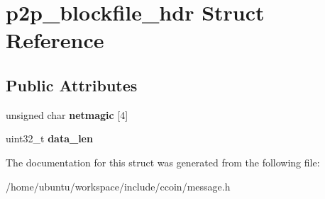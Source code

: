 \hypertarget{structp2p__blockfile__hdr}{\section{p2p\-\_\-blockfile\-\_\-hdr Struct Reference}
\label{structp2p__blockfile__hdr}
}
\subsection*{Public Attributes}
\begin{DoxyCompactItemize}
\item 
\hypertarget{structp2p__blockfile__hdr_a263f8d539551f10b291a56e3ebeb7888}{unsigned char {\bfseries netmagic} \mbox{[}4\mbox{]}}\label{structp2p__blockfile__hdr_a263f8d539551f10b291a56e3ebeb7888}

\item 
\hypertarget{structp2p__blockfile__hdr_a69777a42785f1c5090c9499d0704141b}{uint32\-\_\-t {\bfseries data\-\_\-len}}\label{structp2p__blockfile__hdr_a69777a42785f1c5090c9499d0704141b}

\end{DoxyCompactItemize}


The documentation for this struct was generated from the following file\-:\begin{DoxyCompactItemize}
\item 
/home/ubuntu/workspace/include/ccoin/message.\-h\end{DoxyCompactItemize}
